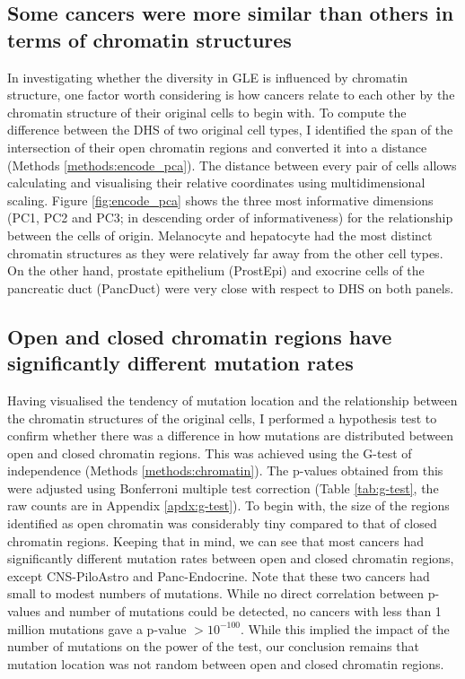 

\subsection{Some cancers were more similar than others in terms of chromatin structures}\label{gle:pca}
In investigating whether the diversity in GLE is influenced by chromatin structure, one factor worth considering is how cancers relate to each other by the chromatin structure of their original cells to begin with. To compute the difference between the DHS of two original cell types, I identified the span of the intersection of their open chromatin regions and converted it into a distance (Methods \ref{methods:encode_pca}). The distance between every pair of cells allows calculating and visualising their relative coordinates using multidimensional scaling. Figure \ref{fig:encode_pca} shows the three most informative dimensions (PC1, PC2 and PC3; in descending order of informativeness) for the relationship between the cells of origin. Melanocyte and hepatocyte had the most distinct chromatin structures as they were relatively far away from the other cell types. On the other hand, prostate epithelium (ProstEpi) and exocrine cells of the pancreatic duct (PancDuct) were very close with respect to DHS on both panels.



\subsection{Open and closed chromatin regions have significantly different mutation rates}\label{gle:g}
Having visualised the tendency of mutation location and the relationship between the chromatin structures of the original cells, I performed a hypothesis test to confirm whether there was a difference in how mutations are distributed between open and closed chromatin regions. This was achieved using the G-test of independence (Methods \ref{methods:chromatin}). The p-values obtained from this were adjusted using Bonferroni multiple test correction (Table \ref{tab:g-test}, the raw counts are in Appendix \ref{apdx:g-test}). To begin with, the size of the regions identified as open chromatin was considerably tiny compared to that of closed chromatin regions. Keeping that in mind, we can see that most cancers had significantly different mutation rates between open and closed chromatin regions, except CNS-PiloAstro and Panc-Endocrine. Note that these two cancers had small to modest numbers of mutations. While no direct correlation between p-values and number of mutations could be detected, no cancers with less than 1 million mutations gave a p-value $>10^{-100}$. While this implied the impact of the number of mutations on the power of the test, our conclusion remains that mutation location was not random between open and closed chromatin regions. 

